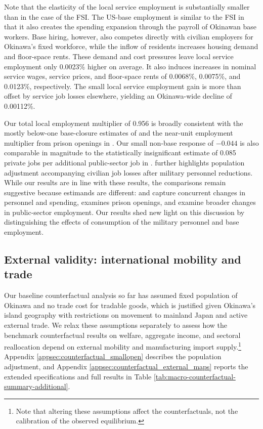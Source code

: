 \documentclass[12pt, unicode, a4paper]{article}
\newcommand{\1}{\mbox{1}\hspace{-0.25em}\mbox{l}} %
\begin{document}
Note that the elasticity of the local service employment is substantially smaller than in the case of the FSI. 
The US-base employment is similar to the FSI in that it also creates the spending expansion through the payroll of Okinawan base workers. Base hiring, however, also competes directly with civilian employers for Okinawa's fixed workforce, while the inflow of residents increases housing demand and floor-space rents. These demand and cost pressures leave local service employment only 0.0023\% higher on average. It also induces increases in nominal service wages, service prices, and floor-space rents of 0.0068\%, 0.0075\%, and 0.0123\%, respectively. The small local service employment gain is more than offset by service job losses elsewhere, yielding an Okinawa-wide decline of 0.00112\%. 

Our total local employment multiplier of 0.956 is broadly consistent with the mostly below-one base-closure estimates of \citet{hooker2001measuring} and the near-unit employment multiplier from prison openings in \citet{chirakijja2024local}. Our small non-base response of $-0.044$ is also comparable in magnitude to the statistically insignificant estimate of 0.085 private jobs per additional public-sector job in \citet{faggio2014effect}. \citet{zou2018local} further highlights population adjustment accompanying civilian job losses after military personnel reductions. While our results are in line with these results, the comparisons remain suggestive because estimands are different: \citet{hooker2001measuring} and \citet{zou2018local} capture concurrent changes in personnel and spending, \citet{chirakijja2024local} examines prison openings, and \citet{faggio2014effect} examine broader changes in public-sector employment. Our results shed new light on this discussion by distinguishing the effects of consumption of the military personnel and base employment.

\subsection{External validity: international mobility and trade}\label{sec:counterfactual_external_validity}

Our baseline counterfactual analysis so far has assumed fixed population of Okinawa and no trade cost for tradable goods, which is justified given Okinawa's island geography with restrictions on movement to mainland Japan and active external trade. We relax these assumptions separately to assess how the benchmark counterfactual results on welfare, aggregate income, and sectoral reallocation depend on external mobility and manufacturing import supply.\footnote{Note that altering these assumptions affect the counterfactuals, not the calibration of the observed equilibrium.} Appendix \ref{appsec:counterfactual_smallopen} describes the population adjustment, and Appendix \ref{appsec:counterfactual_external_maps} reports the extended specifications and full results in Table \ref{tab:macro-counterfactual-summary-additional}.
\end{document}
